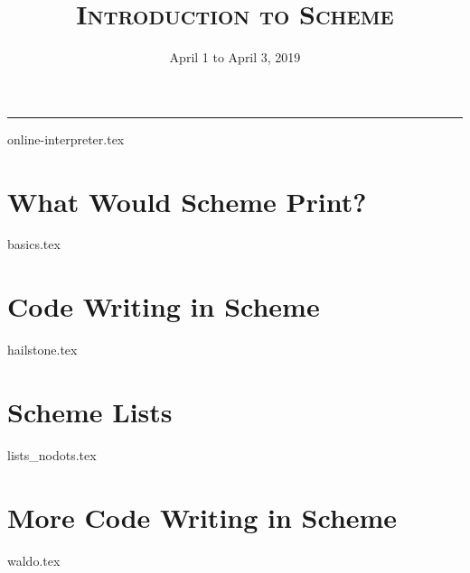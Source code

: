 \documentclass{exam}
\title{\textsc{Introduction to Scheme}}
\date{April 1 to April 3, 2019}
\begin{document}
\maketitle
\rule{\textwidth}{0.15em}
\fontsize{12}{15}\selectfont

{online-interpreter.tex}
\begin{questions}
\section{What Would Scheme Print?}
{basics.tex}

\section{Code Writing in Scheme}
{hailstone.tex}

\section{Scheme Lists}
{lists_nodots.tex}

\section{More Code Writing in Scheme}
{waldo.tex}

\end{questions}
\end{document}
